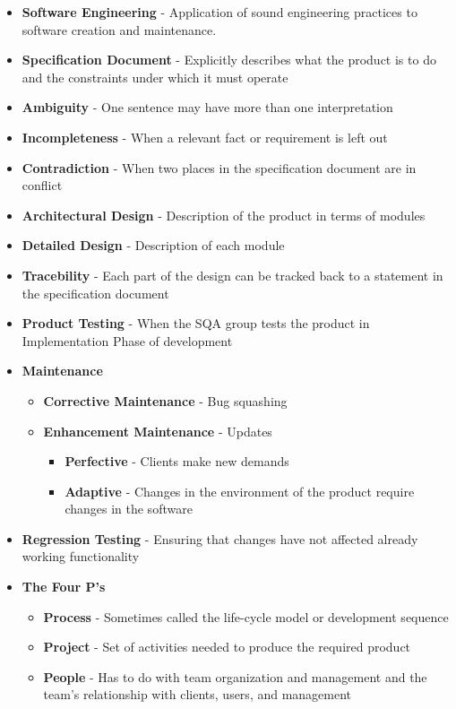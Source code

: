 \documentclass{report}
\begin{document}
	\begin{itemize}
		\item \textbf{Software Engineering} - Application of sound engineering practices to software creation and maintenance.
		\item \textbf{Specification Document} - Explicitly describes what the product is to do and the constraints under which it must operate
		\item \textbf{Ambiguity} - One sentence may have more than one interpretation
		\item \textbf{Incompleteness} - When a relevant fact or requirement is left out
		\item \textbf{Contradiction} - When two places in the specification document are in conflict
		\item \textbf{Architectural Design} - Description of the product in terms of modules
		\item \textbf{Detailed Design} - Description of each module
		\item \textbf{Tracebility} - Each part of the design can be tracked back to a statement in the specification document
		\item \textbf{Product Testing} - When the SQA group tests the product in Implementation Phase of development
		\item \textbf{Maintenance}
			\begin{itemize}
				\item \textbf{Corrective Maintenance} - Bug squashing
				\item \textbf{Enhancement Maintenance} - Updates
					\begin{itemize}
						\item \textbf{Perfective} - Clients make new demands
						\item \textbf{Adaptive} - Changes in the environment of the product require changes in the software
					\end{itemize}
			\end{itemize}
		\item \textbf{Regression Testing} - Ensuring that changes have not affected already working functionality
		\item \textbf{The Four P's}
			\begin{itemize}
				\item \textbf{Process} - Sometimes called the life-cycle model or development sequence
				\item \textbf{Project} - Set of activities needed to produce the required product
				\item \textbf{People} - Has to do with team organization and management and the team's relationship with clients, users, and management

\end{itemize}
\end{itemize}
\end{document}
